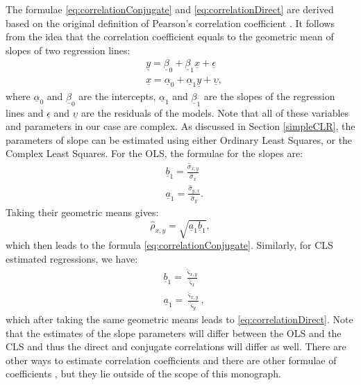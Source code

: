 \documentclass[
]{book}
\begin{document}
The formulae \eqref{eq:correlationConjugate} and \eqref{eq:correlationDirect} are derived based on the original definition of Pearson's correlation coefficient \citep{pearson1905general}. It follows from the idea that the correlation coefficient equals to the geometric mean of slopes of two regression lines:
\begin{equation}
    \begin{aligned}
        &\underline{y} = \underline{\beta}_0 + \underline{\beta}_1 \underline{x} + \underline{\epsilon} \\
        &\underline{x} = \underline{\alpha}_0 + \underline{\alpha}_1 \underline{y} + \underline{\upsilon} ,
    \end{aligned}
    \label{eq:twoRegressions}
\end{equation}
where \(\underline{\alpha}_0\) and \(\underline{\beta}_0\) are the intercepts, \(\underline{\alpha}_1\) and \(\underline{\beta}_1\) are the slopes of the regression lines and \(\underline{\epsilon}\) and \(\underline{\upsilon}\) are the residuals of the models. Note that all of these variables and parameters in our case are complex. As discussed in Section \ref{simpleCLR}, the parameters of slope can be estimated using either Ordinary Least Squares, or the Complex Least Squares. For the OLS, the formulae for the slopes are:
\begin{equation}
    \begin{aligned}
        &\underline{b}_1 = \frac{\hat{\sigma}_{x,y}}{\hat{\sigma}_x} \\
        &\underline{a}_1 = \frac{\hat{\sigma}_{y,x}}{\hat{\sigma}_y} .
    \end{aligned}
    \label{eq:twoRegressionsOLS}
\end{equation}
Taking their geometric means gives:
\begin{equation}
    \hat{\rho}_{x,y} = \sqrt{\underline{a}_1 \underline{b}_1},
    \label{eq:correlationConventionalEstimate}
\end{equation}
which then leads to the formula \eqref{eq:correlationConjugate}. Similarly, for CLS estimated regressions, we have:
\begin{equation}
    \begin{aligned}
        &\underline{b}_1 = \frac{\hat{\varsigma}_{x,y}}{\hat{\varsigma}_x} \\
        &\underline{a}_1 = \frac{\hat{\varsigma}_{x,y}}{\hat{\varsigma}_y} ,
    \end{aligned}
    \label{eq:twoRegressionsCLS}
\end{equation}
which after taking the same geometric means leads to \eqref{eq:correlationDirect}. Note that the estimates of the slope parameters will differ between the OLS and the CLS and thus the direct and conjugate correlations will differ as well. There are other ways to estimate correlation coefficients \citep[e.g.,][]{Miyabe2015} and there are other formulae of coefficients \citep{Schreier2010}, but they lie outside of the scope of this monograph.
\end{document}
